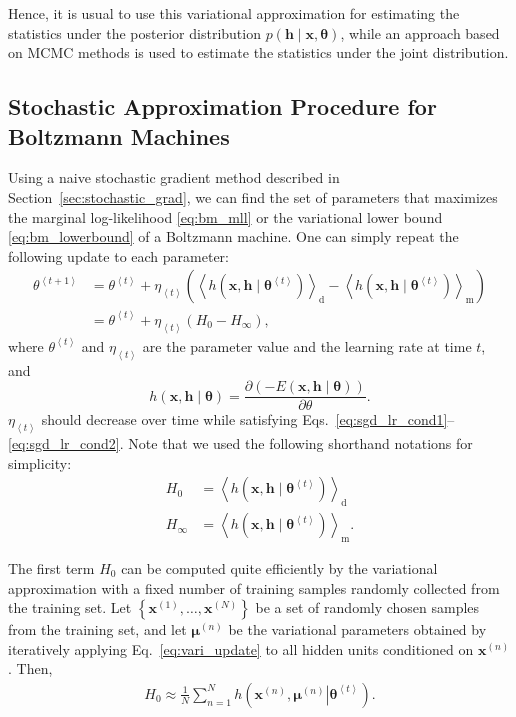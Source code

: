 \documentclass{now}
\newcommand{\qt}[1]{\left<#1\right>}
\newcommand{\vect}[1]{\mathbf{#1}}
\newcommand{\vects}[1]{\boldsymbol{#1}}
\newcommand{\vh}[0]{\vect{h}}
\newcommand{\vx}[0]{\vect{x}}
\newcommand{\td}[0]{\text{d}}
\newcommand{\vmu}[0]{\vects{\mu}}
\newcommand{\tf}[0]{\text{m}}
\newcommand{\TT}[0]{{\vects{\theta}}}
\begin{document}
Hence, it is usual to use this variational approximation for
estimating the statistics under the posterior distribution
${p(\vh \mid \vx, \TT)}$, while an approach based on MCMC
methods is used to estimate the statistics under the joint
distribution. 

\subsection{Stochastic Approximation Procedure for Boltzmann Machines}
\label{sec:sap}

Using a naive stochastic gradient method described in
Section~\ref{sec:stochastic_grad}, we can find the set of
parameters that maximizes the marginal log-likelihood
\eqref{eq:bm_mll} or the variational lower bound
\eqref{eq:bm_lowerbound} of a Boltzmann machine. One can
simply repeat the following update to each parameter:
\begin{align}
    \theta^{\qt{t+1}} &= \theta^{\qt{t}} + \eta_{\qt{t}} \left( 
    \left< h(\vx, \vh\mid \TT^{\qt{t}})
    \right>_\td 
    -
    \left< h(\vx, \vh\mid \TT^{\qt{t}})
    \right>_\tf \right) 
    \nonumber
    \\
    \label{eq:sap_grad}
    &= \theta^{\qt{t}} + \eta_{\qt{t}} \left( H_0 - H_\infty \right),
\end{align}
where $\theta^{\qt{t}}$ and $\eta_{\qt{t}}$ are the parameter value and
the learning rate at time $t$, and
\[
h(\vx, \vh \mid \TT) = \frac{\partial
    \left(-E(\vx, \vh\mid\TT)\right)}{\partial \theta}.
\]
$\eta_{\qt{t}}$ should decrease over time while satisfying
Eqs.~\eqref{eq:sgd_lr_cond1}--\eqref{eq:sgd_lr_cond2}. Note
that we used the following shorthand notations for
simplicity:
\begin{align*}
    H_0 &= \left< h(\vx, \vh\mid \TT^{\qt{t}})
    \right>_\td \\
    H_\infty &= \left< h(\vx, \vh\mid \TT^{\qt{t}})
    \right>_\tf.
\end{align*}

The first term $H_0$ can be computed quite efficiently by
the variational approximation with a fixed number of
training samples randomly collected from the training set.
Let $\left\{ \vx^{(1)}, \dots, \vx^{(N)} \right\}$ be a
set  of randomly chosen samples from the training set, and
let $\vmu^{(n)}$ be the variational parameters obtained by
iteratively applying Eq.~\eqref{eq:vari_update} to all
hidden units conditioned on $\vx^{(n)}$. Then, 
\begin{align*}
    H_0 \approx \frac{1}{N}\sum_{n=1}^{N} h\left(\left.\vx^{(n)}, \vmu^{(n)}
    \right| \TT^{\qt{t}}\right).
\end{align*}
\end{document}
